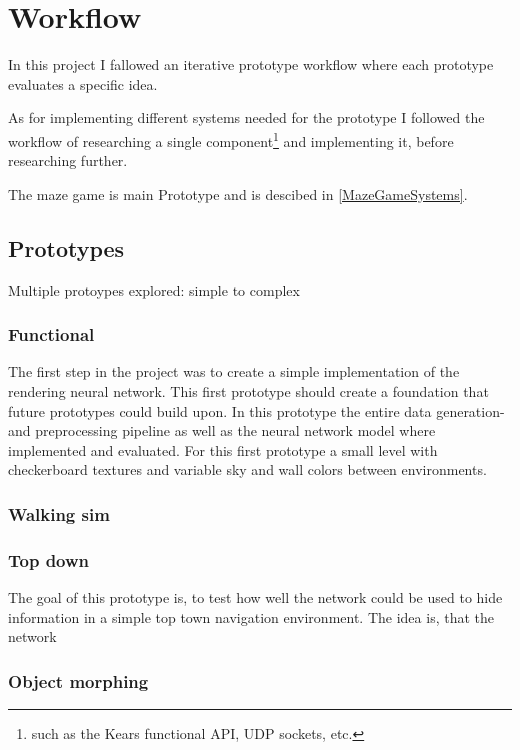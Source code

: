 
\chapter{Workflow}
In this project I fallowed an iterative prototype workflow where each prototype evaluates a specific idea.

As for implementing different systems needed for the prototype I followed the workflow of researching a single component\footnote{such as the Kears functional API, UDP sockets, etc.} and implementing it, before researching further.

The maze game is main Prototype and is descibed in \cref{MazeGameSystems}.

\section{Prototypes}
Multiple protoypes explored: simple to complex


\subsection{Functional}
The first step in the project was to create a simple implementation of the rendering neural network. This first prototype should create a foundation that future prototypes could build upon. In this prototype the entire data generation- and preprocessing pipeline as well as the neural network model where implemented and evaluated. For this first prototype a small level with checkerboard textures and variable sky and wall colors between environments.



\subsection{Walking sim}


\subsection{Top down}
The goal of this prototype is, to test how well the network could be used to hide information in a simple top town navigation environment.
The idea is, that the network



\subsection{Object morphing}

